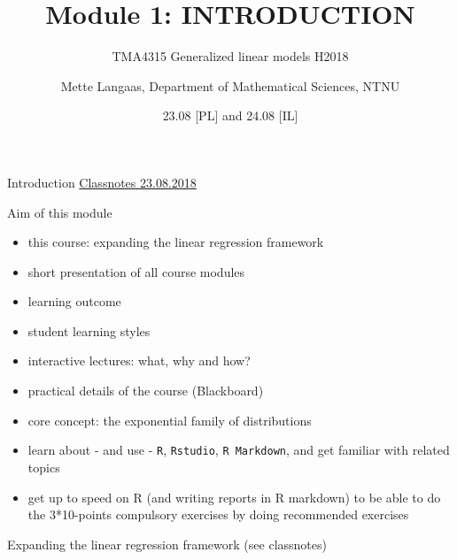 \documentclass[
  ignorenonframetext,
]{beamer}
\title{Module 1: INTRODUCTION}
\subtitle{TMA4315 Generalized linear models H2018}
\author{Mette Langaas, Department of Mathematical Sciences, NTNU}
\date{23.08 {[}PL{]} and 24.08 {[}IL{]}}
\begin{document}
\frame{\titlepage}

\begin{frame}[fragile]{Introduction}
\protect\hypertarget{introduction}{}
\href{https://www.math.ntnu.no/emner/TMA4315/2018h/TMA4315M1H2018.pdf}{Classnotes
23.08.2018}

\begin{block}{Aim of this module}
\protect\hypertarget{aim-of-this-module}{}
\begin{itemize}
\item
  this course: expanding the linear regression framework
\item
  short presentation of all course modules
\item
  learning outcome
\item
  student learning styles
\item
  interactive lectures: what, why and how?
\item
  practical details of the course (Blackboard)
\item
  core concept: the exponential family of distributions
\item
  learn about - and use - \texttt{R}, \texttt{Rstudio},
  \texttt{R\ Markdown}, and get familiar with related topics
\item
  get up to speed on R (and writing reports in R markdown) to be able to
  do the 3*10-points compulsory exercises by doing recommended exercises
\end{itemize}
\end{block}
\end{frame}

\begin{frame}
\begin{block}{Expanding the linear regression framework}
\protect\hypertarget{expanding-the-linear-regression-framework}{}
(see classnotes)
\end{block}
\end{frame}
\end{document}

